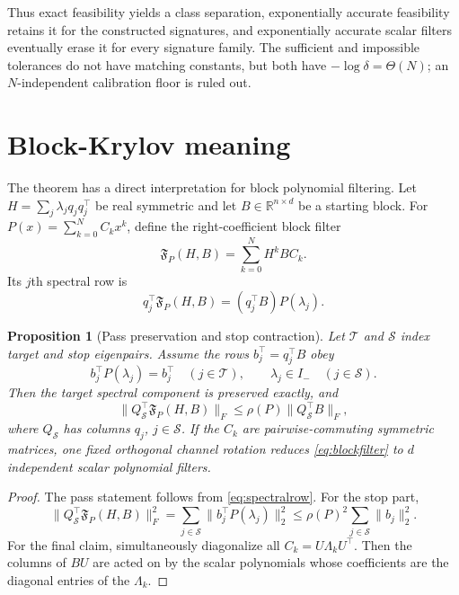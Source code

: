 \documentclass[11pt]{article}
\newtheorem{proposition}[theorem]{Proposition}
\theoremstyle{remark}
\newcommand{\R}{\mathbb{R}}
\begin{document}
Thus exact feasibility yields a class separation, exponentially accurate
feasibility retains it for the constructed signatures, and exponentially
accurate scalar filters eventually erase it for every signature family.  The
sufficient and impossible tolerances do not have matching constants, but both
have $-\log\delta=\Theta(N)$; an $N$-independent calibration floor is ruled out.

\section{Block-Krylov meaning}

The theorem has a direct interpretation for block polynomial filtering.  Let
$H=\sum_j\lambda_jq_jq_j^\top$ be real symmetric and let $B\in\R^{n\times d}$
be a starting block.  For $P(x)=\sum_{k=0}^NC_kx^k$, define the right-coefficient
block filter
\begin{equation}\label{eq:blockfilter}
 \mathfrak F_P(H,B)=\sum_{k=0}^N H^kBC_k.
\end{equation}
Its $j$th spectral row is
\begin{equation}\label{eq:spectralrow}
 q_j^\top\mathfrak F_P(H,B)=(q_j^\top B)P(\lambda_j).
\end{equation}

\begin{proposition}[Pass preservation and stop contraction]
\label{prop:krylov}
Let $\mathcal T$ and $\mathcal S$ index target and stop eigenpairs.  Assume the
rows $b_j^\top=q_j^\top B$ obey
\[
 b_j^\top P(\lambda_j)=b_j^\top \quad(j\in\mathcal T),
 \qquad \lambda_j\in I_- \quad(j\in\mathcal S).
\]
Then the target spectral component is preserved exactly, and
\[
 \|Q_\mathcal S^\top\mathfrak F_P(H,B)\|_F
 \le \rho(P)\|Q_\mathcal S^\top B\|_F,
\]
where $Q_\mathcal S$ has columns $q_j$, $j\in\mathcal S$.
If the $C_k$ are pairwise-commuting symmetric matrices, one fixed orthogonal
channel rotation reduces \eqref{eq:blockfilter} to $d$ independent scalar
polynomial filters.
\end{proposition}

\begin{proof}
The pass statement follows from \eqref{eq:spectralrow}.  For the stop part,
\[
 \|Q_\mathcal S^\top\mathfrak F_P(H,B)\|_F^2
 =\sum_{j\in\mathcal S}\|b_j^\top P(\lambda_j)\|_2^2
 \le\rho(P)^2\sum_{j\in\mathcal S}\|b_j\|_2^2.
\]
For the final claim, simultaneously diagonalize all $C_k=U\Lambda_kU^\top$.
Then the columns of $BU$ are acted on by the scalar polynomials whose
coefficients are the diagonal entries of the $\Lambda_k$.
\end{proof}
\end{document}
